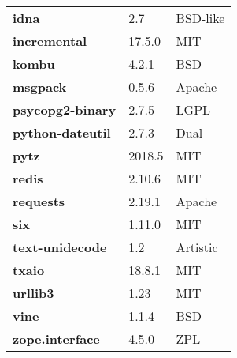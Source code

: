 \begin{longtable}{| p{} | p{} | p{} |}
\textbf{idna} & 2.7 & BSD-like \\
\textbf{incremental} & 17.5.0 & MIT \\
\textbf{kombu} & 4.2.1 & BSD \\
\textbf{msgpack} & 0.5.6 & Apache \\
\textbf{psycopg2-binary} & 2.7.5 & LGPL \\
\textbf{python-dateutil} & 2.7.3 & Dual \\
\textbf{pytz} & 2018.5 & MIT \\
\textbf{redis} & 2.10.6 & MIT \\
\textbf{requests} & 2.19.1 & Apache \\
\textbf{six} & 1.11.0 & MIT \\
\textbf{text-unidecode} & 1.2 & Artistic \\
\textbf{txaio} & 18.8.1 & MIT \\
\textbf{urllib3} & 1.23 & MIT \\
\textbf{vine} & 1.1.4 & BSD \\
\textbf{zope.interface} & 4.5.0 & ZPL \\
\hline
\end{longtable}

